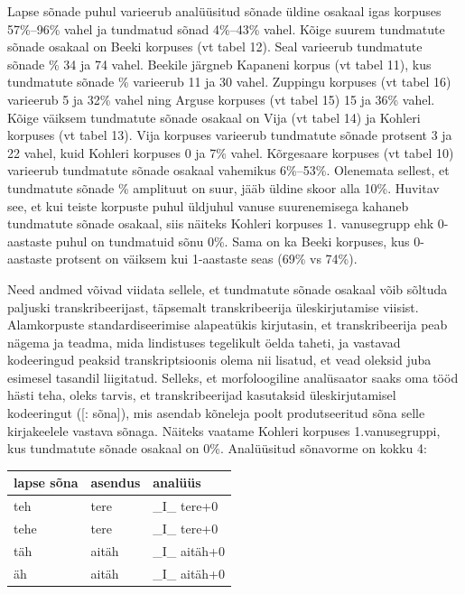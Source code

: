 \documentclass[12pt]{article}
\begin{document}
Lapse sõnade puhul varieerub analüüsitud sõnade üldine osakaal igas korpuses 57\%--96\% vahel ja tundmatud sõnad 4\%--43\% vahel. Kõige suurem tundmatute sõnade osakaal on Beeki korpuses (vt tabel 12). Seal varieerub tundmatute sõnade \% 34 ja 74 vahel. Beekile järgneb Kapaneni korpus (vt tabel 11), kus tundmatute sõnade \% varieerub 11 ja 30 vahel. Zuppingu korpuses (vt tabel 16) varieerub 5 ja 32\% vahel ning Arguse korpuses (vt tabel 15) 15 ja 36\% vahel. Kõige väiksem tundmatute sõnade osakaal on Vija (vt tabel 14) ja Kohleri korpuses (vt tabel 13). Vija korpuses varieerub tundmatute sõnade protsent 3 ja 22 vahel, kuid Kohleri korpuses 0 ja 7\% vahel. Kõrgesaare korpuses (vt tabel 10) varieerub tundmatute sõnade osakaal vahemikus 6\%--53\%. Olenemata sellest, et tundmatute sõnade \% amplituut on suur, jääb üldine skoor alla 10\%. Huvitav see, et kui teiste korpuste puhul üldjuhul vanuse suurenemisega kahaneb tundmatute sõnade osakaal, siis näiteks Kohleri korpuses 1. vanusegrupp ehk 0-aastaste puhul on tundmatuid sõnu 0\%. Sama on ka Beeki korpuses, kus 0-aastaste protsent on väiksem kui 1-aastaste seas (69\% vs 74\%).

Need andmed võivad viidata sellele, et tundmatute sõnade osakaal võib sõltuda paljuski transkribeerijast, täpsemalt transkribeerija üleskirjutamise viisist. Alamkorpuste standardiseerimise alapeatükis kirjutasin, et transkribeerija peab nägema ja teadma, mida lindistuses tegelikult öelda taheti, ja vastavad kodeeringud peaksid transkriptsioonis olema nii lisatud, et vead oleksid juba esimesel tasandil liigitatud.
Selleks, et morfoloogiline analüsaator saaks oma tööd hästi teha, oleks tarvis, et transkribeerijad kasutaksid üleskirjutamisel kodeeringut ([: sõna]), mis asendab kõneleja poolt produtseeritud sõna selle kirjakeelele vastava sõnaga. Näiteks vaatame Kohleri korpuses 1.vanusegruppi, kus tundmatute sõnade osakaal on 0\%. Analüüsitud sõnavorme on kokku 4:

\begin{table}[H]
\begin{tabular}{|l|l|l|}
\hline
lapse sõna & asendus & analüüs       \\ \hline\hline
teh        & tere    & \_I\_ tere+0  \\ \hline
tehe       & tere    & \_I\_ tere+0  \\ \hline
täh        & aitäh   & \_I\_ aitäh+0 \\ \hline
äh         & aitäh   & \_I\_ aitäh+0 \\ \hline
\end{tabular}
\end{table}
\end{document}
